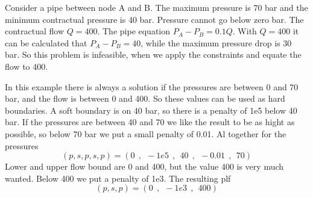 \documentclass[]{article}
\begin{document}
Consider a pipe between node A and B. 
The maximum pressure is 70 bar and the minimum contractual pressure is 40 bar.
Pressure cannot go below zero bar.
The contractual flow $Q = 400$.
The pipe equation $P_A - P_B = 0.1 Q$.
With $Q = 400$ it can be calculated that $P_A - P_B = 40$,
while the maximum pressure drop is 30 bar.
So this problem is infeasible, when we apply the constraints and equate the flow to 400.
   \begin{center}
      \label{cse}
   \end{center}
In this example there is always a solution if the pressures are between 0 and 70 bar,
and the flow is between 0 and 400.
So these values can be used as hard boundaries.
A soft boundary is on 40 bar, so there is a penalty of 1e5 below 40 bar.
If the pressures are between 40 and 70 we like the result to be as hight as possible,
so below 70 bar we put a small penalty of 0.01.
Al together for the pressures
\[ (p, s, p, s, p) = (0 ~~,~~ -1e5 ~~,~~ 40 ~~,~~ -0.01 ~~,~~ 70)\]
Lower and upper flow bound are 0 and 400, but the value 400 is very much wanted.
Below 400 we put a penalty of 1e3.
The resulting plf
\[ (p, s, p) = (0~~,~~ -1e3~~,~~ 400)\]
%
\end{document}
